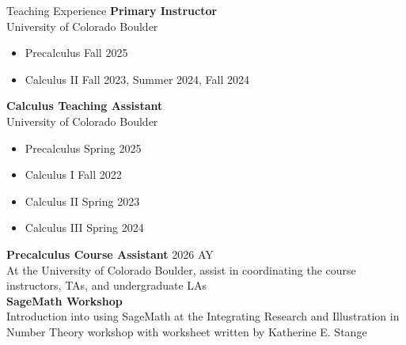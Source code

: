 \documentclass{resume} %
\begin{document}

\begin{rSection}{Teaching Experience}
{\bf Primary Instructor}
\\University of Colorado Boulder
\small
\begin{itemize}
\item Precalculus \hfill Fall 2025
\item Calculus II \hfill Fall 2023, Summer 2024, Fall 2024
\end{itemize}

{\bf Calculus Teaching Assistant}\\
University of Colorado Boulder
\small
\begin{itemize}
\item Precalculus \hfill Spring 2025
\item Calculus I \hfill Fall 2022
\item Calculus II \hfill Spring 2023
\item Calculus III \hfill Spring 2024
\end{itemize}

{\bf Precalculus Course Assistant} \hfill 2026 AY\\
\small
At the University of Colorado Boulder, assist in coordinating the course instructors, TAs, and undergraduate LAs \\

{\bf SageMath Workshop}\\
\small 
Introduction into using SageMath at the Integrating Research and Illustration in Number Theory workshop with worksheet written by Katherine E. Stange


\end{rSection}

\end{document}
